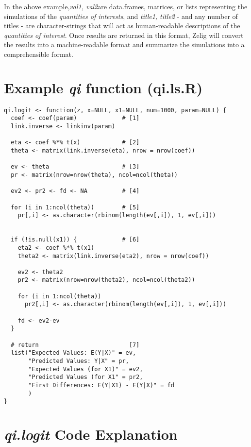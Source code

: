 \documentclass[11pt]{article}
\begin{document}
In the above example,\emph{val1, val2}are data.frames, matrices, or lists representing the simulations of the \emph{quantities of interests}, and \emph{title1, title2} - and any number of titles - are character-strings that will act as human-readable descriptions of the \emph{quantities of interest}.  Once results are returned in this format, Zelig will convert the results into a machine-readable format and summarize the simulations into a comprehensible format.


\pagebreak

\section{Example \emph{qi} function (qi.ls.R)}


\begin{verbatim}
qi.logit <- function(z, x=NULL, x1=NULL, num=1000, param=NULL) {
  coef <- coef(param)             # [1]
  link.inverse <- linkinv(param)

  eta <- coef %*% t(x)            # [2]
  theta <- matrix(link.inverse(eta), nrow = nrow(coef))

  ev <- theta                     # [3]
  pr <- matrix(nrow=nrow(theta), ncol=ncol(theta))

  ev2 <- pr2 <- fd <- NA          # [4]

  for (i in 1:ncol(theta))        # [5]
    pr[,i] <- as.character(rbinom(length(ev[,i]), 1, ev[,i]))


  if (!is.null(x1)) {             # [6]
    eta2 <- coef %*% t(x1)
    theta2 <- matrix(link.inverse(eta2), nrow = nrow(coef))

    ev2 <- theta2
    pr2 <- matrix(nrow=nrow(theta2), ncol=ncol(theta2))

    for (i in 1:ncol(theta))
      pr2[,i] <- as.character(rbinom(length(ev[,i]), 1, ev[,i]))

    fd <- ev2-ev
  }

  # return                          [7]
  list("Expected Values: E(Y|X)" = ev,
       "Predicted Values: Y|X" = pr,
       "Expected Values (for X1)" = ev2,
       "Predicted Values (for X1" = pr2,
       "First Differences: E(Y|X1) - E(Y|X)" = fd
       )
}

\end{verbatim}

\section{\emph{qi.logit} Code Explanation}
\end{document}
